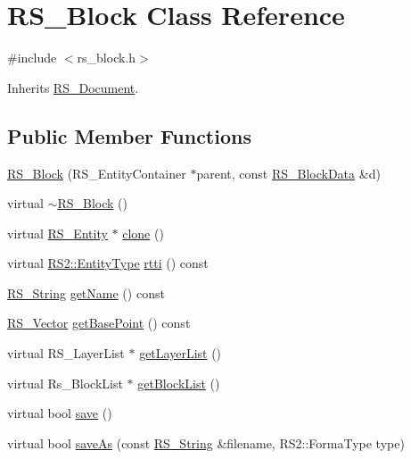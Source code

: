 \hypertarget{class_r_s___block}{\section{R\-S\-\_\-\-Block Class Reference}
\label{class_r_s___block}
}


{\ttfamily \#include $<$rs\-\_\-block.\-h$>$}



Inherits \hyperlink{class_r_s___document}{R\-S\-\_\-\-Document}.

\subsection*{Public Member Functions}
\begin{DoxyCompactItemize}
\item 
\hyperlink{class_r_s___block_a6b07340f917f5fc95285761d3d46c391}{R\-S\-\_\-\-Block} (R\-S\-\_\-\-Entity\-Container $\ast$parent, const \hyperlink{class_r_s___block_data}{R\-S\-\_\-\-Block\-Data} \&d)
\item 
virtual \hyperlink{class_r_s___block_a07ddcb46d07ffc3ea95ef5cfc4df2b08}{$\sim$\-R\-S\-\_\-\-Block} ()
\item 
virtual \hyperlink{class_r_s___entity}{R\-S\-\_\-\-Entity} $\ast$ \hyperlink{class_r_s___block_ad5cd65d01b7af57b3635d1d38c3175df}{clone} ()
\item 
virtual \hyperlink{class_r_s2_a8f26d1b981e1e85cff16738b43337e6a}{R\-S2\-::\-Entity\-Type} \hyperlink{class_r_s___block_acfe58f363ff7e72ac42d51dbfd3f0b71}{rtti} () const 
\item 
\hyperlink{rs__string_8h_a5adec11f318c2ae2ecdc6fe2b03be9fa}{R\-S\-\_\-\-String} \hyperlink{class_r_s___block_a52af2fe1df01e2f10377c9bbdbfa671f}{get\-Name} () const 
\item 
\hyperlink{class_r_s___vector}{R\-S\-\_\-\-Vector} \hyperlink{class_r_s___block_aa4f776303c15ed622bba648945e42738}{get\-Base\-Point} () const 
\item 
virtual R\-S\-\_\-\-Layer\-List $\ast$ \hyperlink{class_r_s___block_a7f1df44875a4cf50f391636658704dd8}{get\-Layer\-List} ()
\item 
virtual Rs\-\_\-\-Block\-List $\ast$ \hyperlink{class_r_s___block_a42f298e8fbeae865268a115938ed18d9}{get\-Block\-List} ()
\item 
virtual bool \hyperlink{class_r_s___block_abbacf2514a8da85c26bb988e8e13f3f7}{save} ()
\item 
virtual bool \hyperlink{class_r_s___block_ae3272406d750ba47cac95a1411d96092}{save\-As} (const \hyperlink{rs__string_8h_a5adec11f318c2ae2ecdc6fe2b03be9fa}{R\-S\-\_\-\-String} \&filename, R\-S2\-::\-Forma\-Type type)

\end{DoxyCompactItemize}
